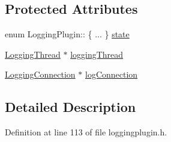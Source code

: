 \subsection*{\-Protected \-Attributes}
\begin{DoxyCompactItemize}
\item 
enum \-Logging\-Plugin\-:: \{ ... \}  \hyperlink{class_logging_plugin_ae4e8e9ffae93981361d7569667082cf3}{state}
\item 
\hyperlink{class_logging_thread}{\-Logging\-Thread} $\ast$ \hyperlink{class_logging_plugin_a0e2c95cb5a17fd852e075212993e4ba3}{logging\-Thread}
\item 
\hyperlink{class_logging_connection}{\-Logging\-Connection} $\ast$ \hyperlink{class_logging_plugin_aa8ec59a3e026606b2e503ff2644c9e64}{log\-Connection}
\end{DoxyCompactItemize}


\subsection{\-Detailed \-Description}


\-Definition at line 113 of file loggingplugin.\-h.



